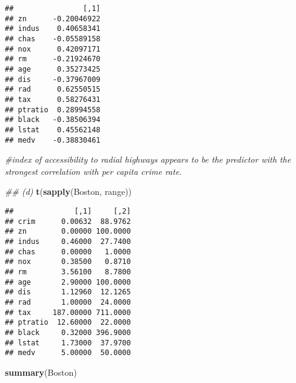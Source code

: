 \documentclass[]{article}
\newenvironment{Shaded}{\begin{snugshade}}{\end{snugshade}}
\newcommand{\CommentTok}[1]{\textcolor[rgb]{0.56,0.35,0.01}{\textit{#1}}}
\newcommand{\DecValTok}[1]{\textcolor[rgb]{0.00,0.00,0.81}{#1}}
\newcommand{\KeywordTok}[1]{\textcolor[rgb]{0.13,0.29,0.53}{\textbf{#1}}}
\newcommand{\NormalTok}[1]{#1}
\newcommand{\OperatorTok}[1]{\textcolor[rgb]{0.81,0.36,0.00}{\textbf{#1}}}
\begin{document}
\begin{Shaded}
\end{Shaded}

\begin{verbatim}
##                [,1]
## zn      -0.20046922
## indus    0.40658341
## chas    -0.05589158
## nox      0.42097171
## rm      -0.21924670
## age      0.35273425
## dis     -0.37967009
## rad      0.62550515
## tax      0.58276431
## ptratio  0.28994558
## black   -0.38506394
## lstat    0.45562148
## medv    -0.38830461
\end{verbatim}

\begin{Shaded}
\begin{Highlighting}[]
\CommentTok{#index of accessibility to radial highways appears to be the predictor with the strongest correlation with per capita crime rate.}

\CommentTok{## (d)}
\KeywordTok{t}\NormalTok{(}\KeywordTok{sapply}\NormalTok{(Boston, range))}
\end{Highlighting}
\end{Shaded}

\begin{verbatim}
##              [,1]     [,2]
## crim      0.00632  88.9762
## zn        0.00000 100.0000
## indus     0.46000  27.7400
## chas      0.00000   1.0000
## nox       0.38500   0.8710
## rm        3.56100   8.7800
## age       2.90000 100.0000
## dis       1.12960  12.1265
## rad       1.00000  24.0000
## tax     187.00000 711.0000
## ptratio  12.60000  22.0000
## black     0.32000 396.9000
## lstat     1.73000  37.9700
## medv      5.00000  50.0000
\end{verbatim}

\begin{Shaded}
\begin{Highlighting}[]
\KeywordTok{summary}\NormalTok{(Boston)}
\end{Highlighting}
\end{Shaded}
\end{document}
